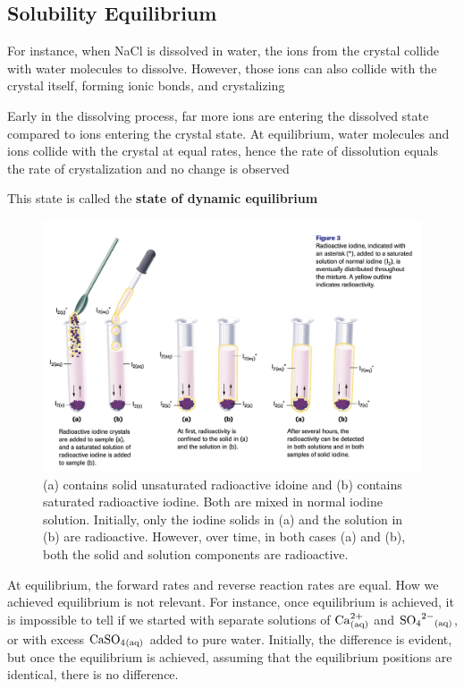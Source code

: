 \subsection{Solubility Equilibrium}
\begin{bulleted-list}
    \item For instance, when NaCl is dissolved in water, the ions from the crystal collide with
        water molecules to dissolve. However, those ions can also collide with the crystal itself,
        forming ionic bonds, and crystalizing
    \item Early in the dissolving process, far more ions are entering the dissolved state compared
        to ions entering the crystal state. At equilibrium, water molecules and ions collide with
        the crystal at equal rates, hence the rate of dissolution equals the rate of crystalization
        and no change is observed
    \item This state is called the \textbf{state of dynamic equilibrium}
\end{bulleted-list}

\begin{figure}[ht!]
    \centering
    \includegraphics[width=0.8 \textwidth]{../figures/radioactive-iodine-solubility-equilibrium.png}
    \caption{(a) contains solid unsaturated radioactive idoine and (b) contains saturated radioactive
    iodine. Both are mixed in normal iodine solution. Initially, only the iodine solids in (a) and
    the solution in (b) are radioactive. However, over time, in both cases (a) and (b), both the
    solid and solution components are radioactive.}
    \label{fig:radioactive-iodine-solubility-equilibrium}
\end{figure}

\begin{important}
    At equilibrium, the forward rates and reverse reaction rates are equal. How we achieved
    equilibrium is not relevant. For instance, once equilibrium is achieved, it is impossible to
    tell if we started with separate solutions of $\ch{Ca^{2+}_{(aq)}}$ and $\ch{SO4^{2-}_{(aq)}}$,
    or with excess $\ch{CaSO4_{(aq)}}$ added to pure water. Initially, the difference is evident,
    but once the equilibrium is achieved, assuming that the equilibrium positions are identical, 
    there is no difference.
\end{important}

